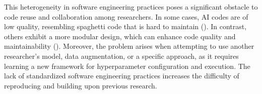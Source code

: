 
This heterogeneity in software engineering practices poses a significant obstacle to code reuse and collaboration among researchers. In some cases, AI codes are of low quality, resembling spaghetti code that is hard to maintain (\cite{seAIsurvey,martinez2022softwareAI,amershi2019software,mainatiblity,leakage-recrisis,gezici2022systematicsoftware}). In contrast, others exhibit a more modular design, which can enhance code quality and maintainability (\cite{seAIsurvey,martinez2022softwareAI,wan2019does}). Moreover, the problem arises when attempting to use another researcher's model, data augmentation, or a specific approach, as it requires learning a new framework for hyperparameter configuration and execution. The lack of standardized software engineering practices increases the difficulty of reproducing and building upon previous research.



